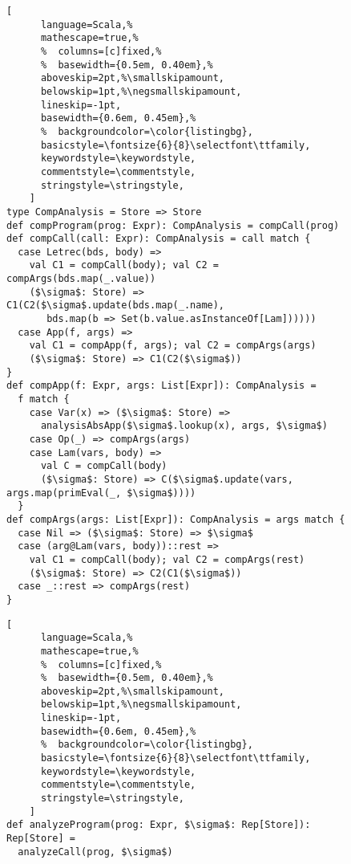 \begin{figure*}
  \centering
  \begin{subfigure}[h]{0.49\textwidth}
    \centering
    \begin{lstlisting}[
      language=Scala,%
      mathescape=true,%
      %  columns=[c]fixed,%
      %  basewidth={0.5em, 0.40em},%
      aboveskip=2pt,%\smallskipamount,
      belowskip=1pt,%\negsmallskipamount,
      lineskip=-1pt,
      basewidth={0.6em, 0.45em},%
      %  backgroundcolor=\color{listingbg},
      basicstyle=\fontsize{6}{8}\selectfont\ttfamily,
      keywordstyle=\keywordstyle,
      commentstyle=\commentstyle,
      stringstyle=\stringstyle,
    ]
type CompAnalysis = Store => Store
def compProgram(prog: Expr): CompAnalysis = compCall(prog)
def compCall(call: Expr): CompAnalysis = call match {
  case Letrec(bds, body) =>
    val C1 = compCall(body); val C2 = compArgs(bds.map(_.value))
    ($\sigma$: Store) => C1(C2($\sigma$.update(bds.map(_.name), 
       bds.map(b => Set(b.value.asInstanceOf[Lam])))))
  case App(f, args) =>
    val C1 = compApp(f, args); val C2 = compArgs(args)
    ($\sigma$: Store) => C1(C2($\sigma$))
}
def compApp(f: Expr, args: List[Expr]): CompAnalysis = 
  f match {
    case Var(x) => ($\sigma$: Store) => 
      analysisAbsApp($\sigma$.lookup(x), args, $\sigma$)
    case Op(_) => compArgs(args)
    case Lam(vars, body) =>
      val C = compCall(body)
      ($\sigma$: Store) => C($\sigma$.update(vars, args.map(primEval(_, $\sigma$))))
  }
def compArgs(args: List[Expr]): CompAnalysis = args match {
  case Nil => ($\sigma$: Store) => $\sigma$
  case (arg@Lam(vars, body))::rest =>
    val C1 = compCall(body); val C2 = compArgs(rest)
    ($\sigma$: Store) => C2(C1($\sigma$))
  case _::rest => compArgs(rest)
}
  \end{lstlisting}
  \end{subfigure}
\hfill
  \begin{subfigure}[h]{0.49\textwidth}
    \centering
    \begin{lstlisting}[
      language=Scala,%
      mathescape=true,%
      %  columns=[c]fixed,%
      %  basewidth={0.5em, 0.40em},%
      aboveskip=2pt,%\smallskipamount,
      belowskip=1pt,%\negsmallskipamount,
      lineskip=-1pt,
      basewidth={0.6em, 0.45em},%
      %  backgroundcolor=\color{listingbg},
      basicstyle=\fontsize{6}{8}\selectfont\ttfamily,
      keywordstyle=\keywordstyle,
      commentstyle=\commentstyle,
      stringstyle=\stringstyle,
    ]
def analyzeProgram(prog: Expr, $\sigma$: Rep[Store]): Rep[Store] = 
  analyzeCall(prog, $\sigma$)

\end{lstlisting}
\end{subfigure}
\end{figure*}

